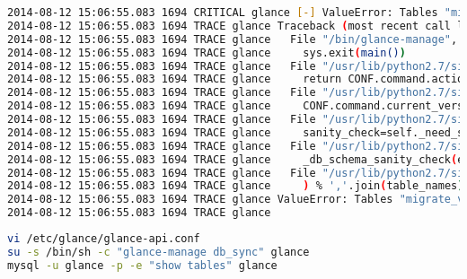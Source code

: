 \documentclass[11pt,letterpaper,oneside]{book}
\begin{document}
\begin{lstlisting}[caption={\danger Red Hat bug},language=bash]
2014-08-12 15:06:55.083 1694 CRITICAL glance [-] ValueError: Tables "migrate_version" have non utf8 collation, please make sure all tables are CHARSET=utf8
2014-08-12 15:06:55.083 1694 TRACE glance Traceback (most recent call last):
2014-08-12 15:06:55.083 1694 TRACE glance   File "/bin/glance-manage", line 10, in <module>
2014-08-12 15:06:55.083 1694 TRACE glance     sys.exit(main())
2014-08-12 15:06:55.083 1694 TRACE glance   File "/usr/lib/python2.7/site-packages/glance/cmd/manage.py", line 259, in main
2014-08-12 15:06:55.083 1694 TRACE glance     return CONF.command.action_fn()
2014-08-12 15:06:55.083 1694 TRACE glance   File "/usr/lib/python2.7/site-packages/glance/cmd/manage.py", line 160, in sync
2014-08-12 15:06:55.083 1694 TRACE glance     CONF.command.current_version)
2014-08-12 15:06:55.083 1694 TRACE glance   File "/usr/lib/python2.7/site-packages/glance/cmd/manage.py", line 137, in sync
2014-08-12 15:06:55.083 1694 TRACE glance     sanity_check=self._need_sanity_check())
2014-08-12 15:06:55.083 1694 TRACE glance   File "/usr/lib/python2.7/site-packages/glance/openstack/common/db/sqlalchemy/migration.py", line 195, in db_sync
2014-08-12 15:06:55.083 1694 TRACE glance     _db_schema_sanity_check(engine)
2014-08-12 15:06:55.083 1694 TRACE glance   File "/usr/lib/python2.7/site-packages/glance/openstack/common/db/sqlalchemy/migration.py", line 221, in _db_schema_sanity_check
2014-08-12 15:06:55.083 1694 TRACE glance     ) % ','.join(table_names))
2014-08-12 15:06:55.083 1694 TRACE glance ValueError: Tables "migrate_version" have non utf8 collation, please make sure all tables are CHARSET=utf8
2014-08-12 15:06:55.083 1694 TRACE glance
\end{lstlisting}

\begin{lstlisting}[caption={\danger Red Hat bug},language=bash]
vi /etc/glance/glance-api.conf 
su -s /bin/sh -c "glance-manage db_sync" glance
mysql -u glance -p -e "show tables" glance
\end{lstlisting}
\end{document}
